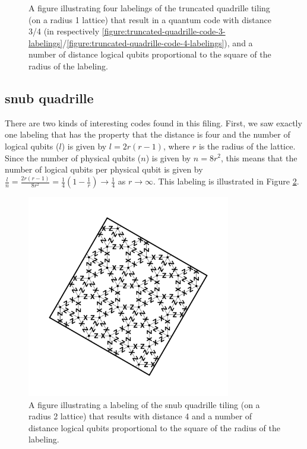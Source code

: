\documentclass[12pt]{amsbook}
\theoremstyle{plain}
\theoremstyle{definition}
\theoremstyle{remark}
\newcommand{\paren}[1]{\left(#1\right)}
\begin{document}
\begin{figure}
\caption{
\label{figure:truncated-quadrille-code-labelings}
A figure illustrating four labelings of the truncated quadrille tiling (on a radius 1 lattice) that result in a quantum code with distance 3/4 (in respectively \ref{figure:truncated-quadrille-code-3-labelings}/\ref{figure:truncated-quadrille-code-4-labelings}), and a number of distance logical qubits proportional to the square of the radius of the labeling.
}
\end{figure}
\subsection{snub quadrille}


There are two kinds of interesting codes found in this filing.  First, we saw exactly one labeling that has the property that the distance is four and the number of logical qubits ($l$) is given by $l=2r(r-1)$, where $r$ is the radius of the lattice.  Since the number of physical qubits ($n$) is given by $n=8r^2$, this means that the number of logical qubits per physical qubit is given by $\frac{l}{n}=\frac{2r(r-1)}{8r^2}=\frac{1}{4}\paren{1-\frac{1}{r}}\to\frac{1}{4}$ as $r\to\infty$.  This labeling is illustrated in Figure \ref{figure:snub-quadrille-code-4-labeling}.

\begin{figure}
\includegraphics[width=3.5in]{images/snub-quadrille-code-4-labeling} %
\caption{
\label{figure:snub-quadrille-code-4-labeling}
A figure illustrating a labeling of the snub quadrille tiling (on a radius 2 lattice) that results with distance 4 and a number of distance logical qubits proportional to the square of the radius of the labeling.
}
\end{figure}
\end{document}
